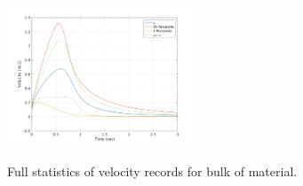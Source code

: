 \documentclass{article}
\begin{document}
\begin{figure}[H]
        \begin{minipage}[b]{1\linewidth}
                \centering
                \includegraphics[width=0.5\textwidth]{InclinedPlane/GlobalRecords/V_Global_Vel.png}
                \label{fig:Ramp-SP-Vel-V}
        \end{minipage}
        \caption{Full statistics of velocity records for bulk of material.}
        \label{fig:Ramp-SP-Vel}
\end{figure}
\end{document}
